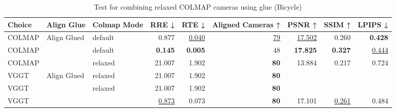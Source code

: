 \begin{table}[H]
\caption{Test for combining relaxed COLMAP cameras using glue (Bicycle)}
\label{tab:99_align_glue_relaxed_bicycle}
\begin{tabular}{lllrrrrrr}
\toprule
Choice & Align Glue & Colmap Mode & RRE ↓ & RTE ↓ & Aligned Cameras ↑ & PSNR ↑ & SSIM ↑ & LPIPS ↓ \\
\midrule
COLMAP & Align Glued & default & 0.877 & \underline{0.040} & \underline{79} & \underline{17.502} & 0.260 & \textbf{0.428} \\
COLMAP &  & default & \textbf{0.145} & \textbf{0.005} & 48 & \textbf{17.825} & \textbf{0.327} & \underline{0.444} \\
COLMAP &  & relaxed & 21.007 & 1.902 & \textbf{80} & 13.884 & 0.217 & 0.724 \\
VGGT & Align Glued & relaxed & 21.007 & 1.902 & \textbf{80} &  &  &  \\
VGGT &  & relaxed & 21.007 & 1.902 & \textbf{80} &  &  &  \\
VGGT &  &  & \underline{0.873} & 0.073 & \textbf{80} & 17.101 & \underline{0.261} & 0.484 \\
\bottomrule
\end{tabular}
\end{table}
